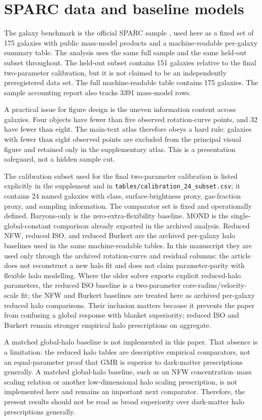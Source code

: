 ﻿\documentclass[twocolumn]{aastex701}
\begin{document}
\section{SPARC data and baseline models}

The galaxy benchmark is the official SPARC sample \citep{lelli2016}, used here as a fixed set of 175 galaxies with public mass-model products and a machine-readable per-galaxy summary table. The analysis uses the same full sample and the same held-out subset throughout. The held-out subset contains 151 galaxies relative to the final two-parameter calibration, but it is not claimed to be an independently preregistered data set. The full machine-readable table contains 175 galaxies. The sample accounting report also tracks 3391 mass-model rows.

A practical issue for figure design is the uneven information content across galaxies. Four objects have fewer than five observed rotation-curve points, and 32 have fewer than eight. The main-text atlas therefore obeys a hard rule: galaxies with fewer than eight observed points are excluded from the principal visual figure and retained only in the supplementary atlas. This is a presentation safeguard, not a hidden sample cut.

The calibration subset used for the final two-parameter calibration is listed explicitly in the supplement and in \texttt{tables/calibration\_24\_subset.csv}; it contains 24 named galaxies with class, surface-brightness proxy, gas-fraction proxy, and sampling information. The comparator set is fixed and operationally defined. Baryons-only is the zero-extra-flexibility baseline. MOND is the single-global-constant comparison already exported in the archived analysis. Reduced NFW, reduced ISO, and reduced Burkert are the archived per-galaxy halo baselines used in the same machine-readable tables. In this manuscript they are used only through the archived rotation-curve and residual columns: the article does not reconstruct a new halo fit and does not claim parameter-parity with flexible halo modelling. Where the older solver exports explicit reduced-halo parameters, the reduced ISO baseline is a two-parameter core-radius/velocity-scale fit; the NFW and Burkert baselines are treated here as archived per-galaxy reduced halo comparisons. Their inclusion matters because it prevents the paper from confusing a global response with blanket superiority; reduced ISO and Burkert remain stronger empirical halo prescriptions on aggregate.

A matched global-halo baseline is not implemented in this paper. That absence is a limitation: the reduced halo tables are descriptive empirical comparators, not an equal-parameter proof that GMR is superior to dark-matter prescriptions generally. A matched global-halo baseline, such as an NFW concentration--mass scaling relation or another low-dimensional halo scaling prescription, is not implemented here and remains an important next comparator. Therefore, the present results should not be read as broad superiority over dark-matter halo prescriptions generally.
\end{document}
